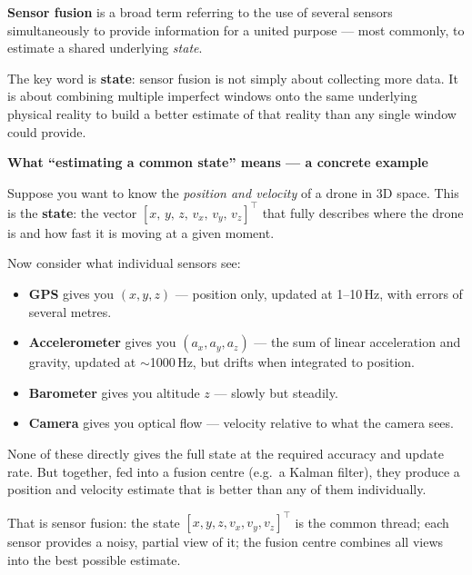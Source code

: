 \documentclass[12pt, a4paper]{article}
\begin{document}
\textbf{Sensor fusion} is a broad term referring to the use of several sensors
simultaneously to provide information for a united purpose --- most commonly,
to estimate a shared underlying \emph{state}.

The key word is \textbf{state}: sensor fusion is not simply about collecting
more data.
It is about combining multiple imperfect windows onto the same underlying
physical reality to build a better estimate of that reality than any single
window could provide.

\begin{notebox}
  \textbf{What ``estimating a common state'' means --- a concrete example}

  Suppose you want to know the \emph{position and velocity} of a drone in
  3D space.
  This is the \textbf{state}: the vector $[x,\, y,\, z,\, v_x,\, v_y,\,
  v_z]^\top$ that fully describes where the drone is and how fast it is moving
  at a given moment.

  Now consider what individual sensors see:
  \begin{itemize}[leftmargin=1.2em, itemsep=2pt]
    \item \textbf{GPS} gives you $(x, y, z)$ --- position only, updated at
      1--10\,Hz, with errors of several metres.
    \item \textbf{Accelerometer} gives you $(a_x, a_y, a_z)$ --- the sum of
      linear acceleration and gravity, updated at $\sim$1000\,Hz, but drifts
      when integrated to position.
    \item \textbf{Barometer} gives you altitude $z$ --- slowly but steadily.
    \item \textbf{Camera} gives you optical flow --- velocity relative to what
      the camera sees.
  \end{itemize}
  None of these directly gives the full state at the required accuracy and
  update rate.
  But together, fed into a fusion centre (e.g.\ a Kalman filter), they
  produce a position and velocity estimate that is better than any of them
  individually.

  That is sensor fusion: the state $[x, y, z, v_x, v_y, v_z]^\top$ is the
  common thread; each sensor provides a noisy, partial view of it; the fusion
  centre combines all views into the best possible estimate.
\end{notebox}
\end{document}
